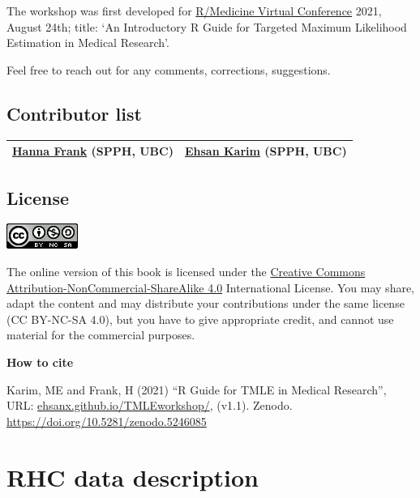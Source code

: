 \documentclass[
]{book}
\begin{document}
The workshop was first developed for \href{https://r-medicine.org/schedule/}{R/Medicine
Virtual Conference} 2021, August 24th; title: `An Introductory R Guide for Targeted Maximum Likelihood Estimation in Medical Research'.

Feel free to reach out for any comments, corrections, suggestions.

\hypertarget{contributor-list}{%
\section*{Contributor list}\label{contributor-list}}

\begin{longtable}[]{@{}ll@{}}
\toprule
\endhead
\href{https://www.linkedin.com/in/hanna-f-940813b9/}{Hanna Frank} (SPPH, UBC) & \href{https://ehsank.com/}{Ehsan Karim} (SPPH, UBC)\tabularnewline
\bottomrule
\end{longtable}

\hypertarget{license}{%
\section*{License}\label{license}}

\includegraphics[width=0.25\linewidth]{images/by-nc-sa}

The online version of this book is licensed under the \href{https://creativecommons.org/licenses/by-nc-sa/4.0/}{Creative Commons Attribution-NonCommercial-ShareAlike 4.0} International License. You may share, adapt the content and may distribute your contributions under the same license (CC BY-NC-SA 4.0), but you have to give appropriate credit, and cannot use material for the commercial purposes.

\begin{rmdcomment}
\textbf{How to cite}

Karim, ME and Frank, H (2021) ``R Guide for TMLE in Medical Research'',
URL:
\href{https://ehsanx.github.io/TMLEworkshop/}{ehsanx.github.io/TMLEworkshop/},
(v1.1). Zenodo. \url{https://doi.org/10.5281/zenodo.5246085}
\end{rmdcomment}

\hypertarget{rhc-data-description}{%
\chapter{RHC data description}\label{rhc-data-description}}
\end{document}
